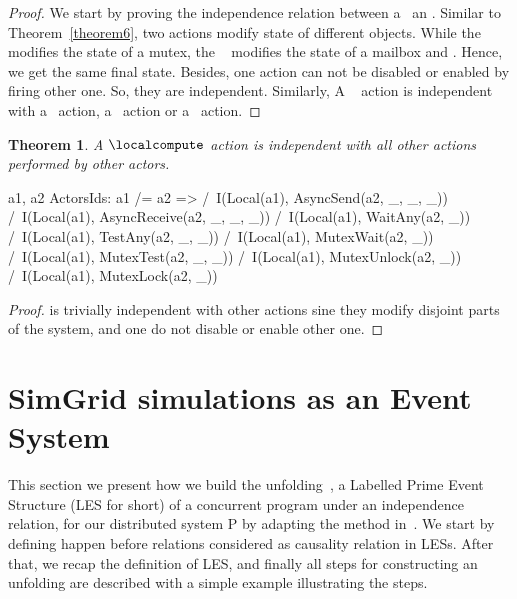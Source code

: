 \documentclass[a4paper,11pt]{article}
\theoremstyle{break}
\newtheorem{theorem}{Theorem}[section]
\begin{document}
\begin{proof}
	We start by proving the independence relation between a \mutexlock~an \asynsend. Similar to Theorem~\ref{theorem6}, two actions modify state of different objects. While the \mutexlock modifies the state of a mutex, the \asynsend~ modifies the state of a mailbox and \Communications. Hence, we get the same final state. Besides, one action can not be disabled or enabled by firing other one. So, they are independent. Similarly, A \mutexlock~ action is independent with a \asynreceive~action, a \test~action or a \wait~action. 
\end{proof}
\begin{theorem}
A $\localcompute$ action is independent with all other actions performed by other actors.
\end{theorem}
\begin{tla}
\forall a1, a2 \in ActorsIds: a1 /= a2 => 
		/\ I(Local(a1), AsyncSend(a2, _, _, _))
		/\ I(Local(a1), AsyncReceive(a2, _, _, _))  
		/\ I(Local(a1), WaitAny(a2, _))   
		/\ I(Local(a1), TestAny(a2, _, _))   
		/\ I(Local(a1), MutexWait(a2, _))
		/\ I(Local(a1), MutexTest(a2, _, _))
		/\ I(Local(a1), MutexUnlock(a2, _))
		/\ I(Local(a1), MutexLock(a2, _))
\end{tla}
\begin{tlatex}
%
%
%
%
%
%
\end{tlatex}


\begin{proof}
\localcompute is trivially independent with other actions sine they modify disjoint parts of the system, and one do not disable or enable other one. 
\end{proof}

\section{SimGrid simulations as an Event System}\label{sec:eventsystem}
This section we present how we build the unfolding~\cite{DBLP:conf/concur/RodriguezSSK15}, a Labelled Prime Event Structure (LES for short) of a concurrent program under an independence relation, for our distributed system P by adapting the method in~\cite{DBLP:journals/corr/abs-1802-03950}. We start by defining happen before relations considered as causality relation in LESs. After that, we recap the definition of LES, and finally all steps for constructing an unfolding are described with a simple example illustrating the steps.
\end{document}

